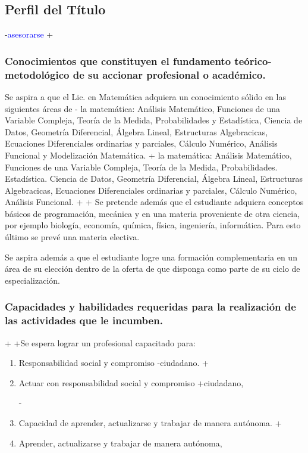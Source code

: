 \begin{description}
 \subsection{Perfil del Título}
-\textcolor{blue}{asesorarse}
+ 
 
 
 \subsubsection{Conocimientos que constituyen el fundamento teórico-metodológico de su accionar profesional o académico.}
 
 Se aspira a que el Lic. en Matemática adquiera un conocimiento sólido en las siguientes  áreas de
- la matemática: Análisis Matemático, Funciones de una Variable Compleja,   Teoría de la Medida, Probabilidades y Estadística, Ciencia de Datos, Geometría Diferencial, Álgebra Lineal, Estructuras Algebracicas, Ecuaciones Diferenciales ordinarias y parciales, Cálculo Numérico, Análisis Funcional y Modelización Matemática.
+ la matemática: Análisis Matemático, Funciones de una Variable Compleja,   Teoría de la Medida, Probabilidades. Estadística. Ciencia de Datos, Geometría Diferencial, Álgebra Lineal, Estructuras Algebracicas, Ecuaciones Diferenciales ordinarias y parciales, Cálculo Numérico, Análisis Funcional.
+ 
+ Se pretende además que el estudiante adquiera conceptos básicos de programación, mecánica y en una materia proveniente de otra ciencia, por ejemplo biología, economía, química, física, ingeniería, informática. Para esto último se prevé una  materia electiva. 
 
  Se aspira además a que el estudiante logre una formación complementaria en un área de su elección dentro de la oferta de que disponga como parte de su ciclo de especialización.
  
 \subsubsection{Capacidades y habilidades requeridas para la realización de las actividades que le incumben.}
 
+
+Se espera lograr un profesional capacitado para:
 \begin{enumerate}
 
-\item {Responsabilidad social y compromiso
-ciudadano.} 
+\item { Actuar con responsabilidad social y compromiso
+ciudadano,} 
 
 
 
-\item {Capacidad de aprender, actualizarse y trabajar de manera autónoma.} 
+\item {Aprender, actualizarse y trabajar de manera autónoma,} 
  

\end{enumerate}
\end{description}
